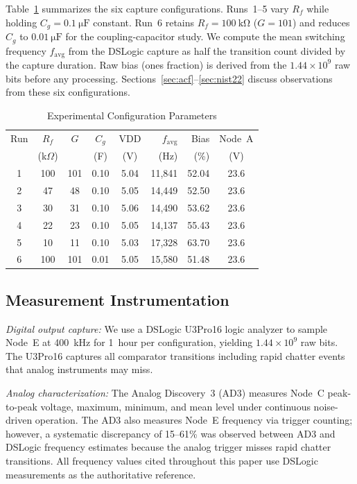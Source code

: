 \documentclass[conference]{IEEEtran}
\newcommand{\favg}{\ensuremath{f_{\mathrm{avg}}}}
\newcommand{\Cg}{\ensuremath{C_g}}
\newcommand{\Rf}{\ensuremath{R_f}}
\begin{document}
Table~\ref{tab:configs} summarizes the six capture configurations.
Runs~1--5 vary $\Rf$ while holding $\Cg=\SI{0.1}{\micro\farad}$
constant. Run~6 retains $\Rf=\SI{100}{\kilo\ohm}$ ($G=101$) and
reduces $\Cg$ to $\SI{0.01}{\micro\farad}$ for the coupling-capacitor
study. We compute the mean switching frequency $\favg$ from the
DSLogic capture as half the transition count divided by the capture
duration. Raw bias (ones fraction) is derived from the
$1.44\!\times\!10^{9}$ raw bits before any processing.
Sections~\ref{sec:acf}--\ref{sec:nist22} discuss observations from
these six configurations.

\begin{table}[t]
\caption{Experimental Configuration Parameters}
\label{tab:configs}
\centering\small
\begin{tabular}{@{}cccccrrc@{}}
\toprule
Run & $\Rf$ & $G$ & $\Cg$ & VDD & $\favg$ & Bias & Node~A \\
    & (k$\Omega$) &     & (\textmu{}F) & (V) & (Hz) & (\%) & (V) \\
\midrule
1 & 100 & 101 & 0.10 & 5.04 & 11{,}841 & 52.04 & 23.6 \\
2 &  47 &  48 & 0.10 & 5.05 & 14{,}449 & 52.50 & 23.6 \\
3 &  30 &  31 & 0.10 & 5.06 & 14{,}490 & 53.62 & 23.6 \\
4 &  22 &  23 & 0.10 & 5.05 & 14{,}137 & 55.43 & 23.6 \\
5 &  10 &  11 & 0.10 & 5.03 & 17{,}328 & 63.70 & 23.6 \\
6 & 100 & 101 & 0.01 & 5.05 & 15{,}580 & 51.48 & 23.6 \\
\bottomrule
\end{tabular}
\end{table}

\subsection{Measurement Instrumentation}

\textit{Digital output capture:} We use a DSLogic U3Pro16 logic analyzer
to sample Node~E at \SI{400}{\kilo\hertz} for 1~hour per configuration,
yielding $1.44\!\times\!10^{9}$ raw bits. The U3Pro16 captures all
comparator transitions including rapid chatter events that analog
instruments may miss.

\textit{Analog characterization:} The Analog Discovery~3 (AD3) measures
Node~C peak-to-peak voltage, maximum, minimum, and mean level under
continuous noise-driven operation. The AD3 also measures Node~E
frequency via trigger counting; however, a systematic discrepancy of
15--61\% was observed between AD3 and DSLogic frequency estimates
because the analog trigger misses rapid chatter transitions. All
frequency values cited throughout this paper use DSLogic measurements
as the authoritative reference.
\end{document}
